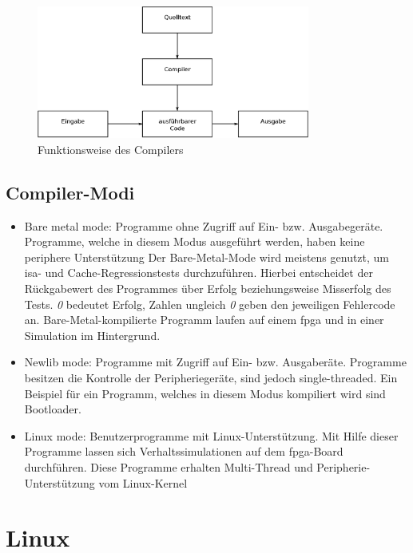 \begin{figure}[H]
\centering
\includegraphics[width=0.8\textwidth]{Hauptteil/Compiler.eps}
\caption{Funktionsweise des Compilers}\label{fig:compiler}
\end{figure}

\subsection{Compiler-Modi}\label{kap:compilermode}
\begin{itemize}
  \item Bare metal mode: Programme ohne Zugriff auf Ein- bzw. Ausgabegeräte. Programme, welche in diesem Modus ausgeführt werden, haben keine periphere Unterstützung
        Der Bare-Metal-Mode wird meistens genutzt, um \ac{isa}- und Cache-Regressionstests durchzuführen. Hierbei entscheidet der Rückgabewert des Programmes über Erfolg beziehungsweise Misserfolg
        des Tests. \emph{0} bedeutet Erfolg, Zahlen ungleich \emph{0} geben den jeweiligen Fehlercode an. Bare-Metal-kompilierte Programm laufen auf einem \ac{fpga} und in einer Simulation
        im Hintergrund.
  \item Newlib mode: Programme mit Zugriff auf Ein- bzw. Ausgaberäte. Programme besitzen die Kontrolle der Peripheriegeräte, sind jedoch single-threaded. Ein Beispiel
  für ein Programm, welches in diesem Modus kompiliert wird sind Bootloader.
  \item Linux mode: Benutzerprogramme mit Linux-Unterstützung. Mit Hilfe dieser Programme lassen sich Verhaltssimulationen auf dem \ac{fpga}-Board durchführen. Diese Programme
  erhalten Multi-Thread und Peripherie-Unterstützung vom Linux-Kernel\cite{lowrisc}\\
\end{itemize}




\section{Linux}\label{kap:linux}


